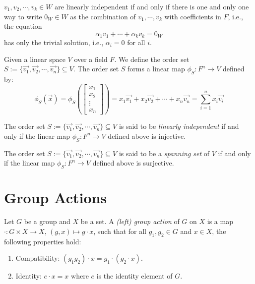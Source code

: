 \documentclass[
	11pt, %
	fleqn, %
	a4paper, %
]{LegrandOrangeBook}
\begin{document}
\begin{proposition}
    $v_1, v_2, \cdots, v_k \in W$ are linearly independent if and only if there is one and only one way to write $0_W \in W$ as the combination of $v_1, \cdots, v_k$ with coefficients in $F$, i.e., the equation 
    \[
        \alpha_1 v_1 + \cdots + \alpha_k v_k = 0_W
    \]
    has only  the trivial solution, i.e., $\alpha_i = 0$ for all $i$.
\end{proposition}

Given a linear space $V$ over a field $F$. We define the order set $S := \{\vec{v_1}, \vec{v_2}, \cdots, \vec{v_n}\} \subseteq V$. The order set $S$ forms a linear map $\phi_S: F^n \to V$ defined by:
\[
    \phi_S(\vec{x}) = \phi_S\left(\begin{bmatrix}
        x_1 \\
        x_2 \\
        \vdots \\
        x_n
    \end{bmatrix}\right) = x_1 \vec{v_1} + x_2 \vec{v_2} + \cdots + x_n \vec{v_n} = \sum_{i=1}^{n} x_i \vec{v_i}
\]

\begin{proposition}
    The order set $S := \{\vec{v_1}, \vec{v_2}, \cdots, \vec{v_n}\} \subseteq V$ is said to be \emph{linearly independent} if and only if the linear map $\phi_S: F^n \to V$ defined above is injective.
\end{proposition}

\begin{proposition}
    The order set $S := \{\vec{v_1}, \vec{v_2}, \cdots, \vec{v_n}\} \subseteq V$ is said to be a \emph{spanning set} of $V$ if and only if the linear map $\phi_S: F^n \to V$ defined above is surjective.
\end{proposition}

\newpage

\section{Group Actions}

\begin{definition}
    Let $G$ be a group and $X$ be a set. A \emph{(left) group action} of $G$ on $X$ is a map $\cdot : G \times X \to X$, $(g, x) \mapsto g \cdot x$, such that for all $g_1, g_2 \in G$ and $x \in X$, the following properties hold:
    \begin{enumerate}
        \item Compatibility: $(g_1 g_2) \cdot x = g_1 \cdot (g_2 \cdot x)$.
        \item Identity: $e \cdot x = x$ where $e$ is the identity element of $G$.
    \end{enumerate}
\end{definition}
\end{document}
